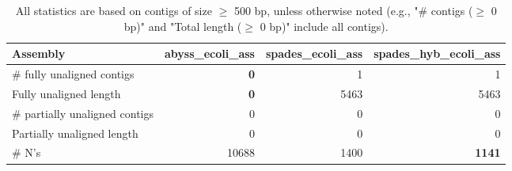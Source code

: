 \documentclass[12pt,a4paper]{article}
\begin{document}
\begin{table}[ht]
\begin{center}
\caption{All statistics are based on contigs of size $\geq$ 500 bp, unless otherwise noted (e.g., "\# contigs ($\geq$ 0 bp)" and "Total length ($\geq$ 0 bp)" include all contigs).}
\begin{tabular}{|l*{3}{|r}|}
\hline
Assembly & abyss\_ecoli\_ass & spades\_ecoli\_ass & spades\_hyb\_ecoli\_ass \\ \hline
\# fully unaligned contigs & {\bf 0} & 1 & 1 \\ \hline
Fully unaligned length & {\bf 0} & 5463 & 5463 \\ \hline
\# partially unaligned contigs & 0 & 0 & 0 \\ \hline
Partially unaligned length & 0 & 0 & 0 \\ \hline
\# N's & 10688 & 1400 & {\bf 1141} \\ \hline
\end{tabular}
\end{center}
\end{table}
\end{document}

